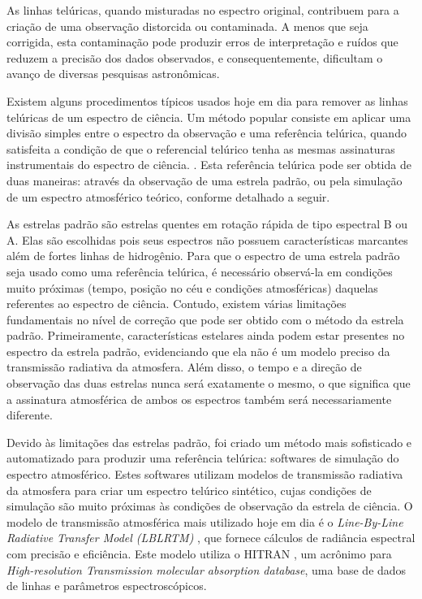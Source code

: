 As linhas telúricas, quando misturadas no espectro original, contribuem para a criação de uma observação distorcida ou contaminada. A menos que seja corrigida, esta contaminação pode produzir erros de interpretação e ruídos que reduzem a precisão dos dados observados, e consequentemente, dificultam o avanço de diversas pesquisas astronômicas.

Existem alguns procedimentos típicos usados hoje em dia para remover as linhas telúricas de um espectro de ciência. Um método popular consiste em aplicar uma divisão simples entre o espectro da observação e uma referência telúrica, quando satisfeita a condição de que o referencial telúrico tenha as mesmas assinaturas instrumentais do espectro de ciência. . Esta referência telúrica pode ser obtida de duas maneiras: através da observação de uma estrela padrão, ou pela simulação de um espectro atmosférico teórico, conforme detalhado a seguir.

As estrelas padrão são estrelas quentes em rotação rápida de tipo espectral B ou A. Elas são escolhidas pois seus espectros não possuem características marcantes além de fortes linhas de hidrogênio. Para que o espectro de uma estrela padrão seja usado como uma referência telúrica, é necessário observá-la em condições muito próximas (tempo, posição no céu e condições atmosféricas) daquelas referentes ao espectro de ciência. Contudo, existem várias limitações fundamentais no nível de correção que pode ser obtido com o método da estrela padrão. Primeiramente, características estelares ainda podem estar presentes no espectro da estrela padrão, evidenciando que ela não é um modelo preciso da transmissão radiativa da atmosfera. Além disso, o tempo e a direção de observação das duas estrelas nunca será exatamente o mesmo, o que significa que a assinatura atmosférica de ambos os espectros também será necessariamente diferente.

Devido às limitações das estrelas padrão, foi criado um método mais sofisticado e automatizado para produzir uma referência telúrica: softwares de simulação do espectro atmosférico. Estes softwares utilizam modelos de transmissão radiativa da atmosfera para criar um espectro telúrico sintético, cujas condições de simulação são muito próximas às condições de observação da estrela de ciência. O modelo de transmissão atmosférica mais utilizado hoje em dia é o \textit{Line-By-Line Radiative Transfer Model (LBLRTM)} \citep{2005JQSRT..91..233C}, que fornece cálculos de radiância espectral com precisão e eficiência. Este modelo utiliza o HITRAN \citep{rothman2009hitran}, um acrônimo para \textit{High-resolution Transmission molecular absorption database}, uma base de dados de linhas e parâmetros espectroscópicos. 

